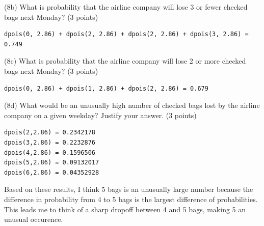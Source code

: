 \documentclass{article}
\begin{document}
(8b) What is probability that the airline company will lose 3 or fewer checked bags next Monday? (3 points)\\
\begin{center}
\begin{lstlisting}
dpois(0, 2.86) + dpois(2, 2.86) + dpois(2, 2.86) + dpois(3, 2.86) = 0.749
\end{lstlisting}
\end{center}
(8c) What is probability that the airline company will lose 2 or more checked bags next Monday? (3 points)
\begin{center}
\begin{lstlisting}
dpois(0, 2.86) + dpois(1, 2.86) + dpois(2, 2.86) = 0.679
\end{lstlisting}
\end{center}
(8d) What would be an unusually high number of checked bags lost by the airline company on a given weekday? Justify your answer. (3 points)\\
\begin{center}
\begin{lstlisting}
dpois(2,2.86) = 0.2342178
dpois(3,2.86) = 0.2232876
dpois(4,2.86) = 0.1596506
dpois(5,2.86) = 0.09132017
dpois(6,2.86) = 0.04352928
\end{lstlisting}
\end{center}
Based on these results, I think 5 bags is an unusually large number because the difference in probability from 4 to 5 bags is the largest difference of probabilities. This leads me to think of a sharp dropoff between 4 and 5 bags, making 5 an unusual occurence.
\end{document}
